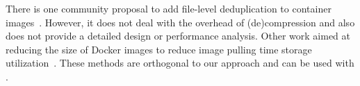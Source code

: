 There is one community proposal to add file-level deduplication to container
images~\cite{Krohmer-proposal}. However, it does not deal with the overhead
of (de)compression and also does not provide a detailed design or performance
analysis.
%
Other work aimed at reducing the size of Docker images to reduce image pulling time storage
utilization~\cite{cntr,rastogi2017cimplifier,gschwind2017optimizing,dockerslim}. 
%
These methods are orthogonal to our approach and can be used  with \sysname.
%
%
%
%
%
%
%
%
